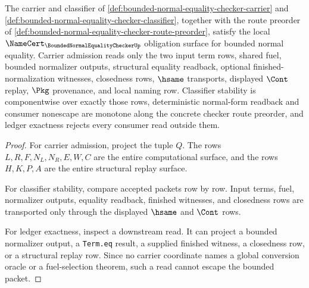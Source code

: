 \begin{theorem}
\label{thm:bounded-normal-equality-checker-namecert-obligations}
The carrier and classifier of
\autoref{def:bounded-normal-equality-checker-carrier} and
\autoref{def:bounded-normal-equality-checker-classifier}, together with the route preorder of \autoref{def:bounded-normal-equality-checker-route-preorder}, satisfy the local
$\NameCert_{\BoundedNormalEqualityCheckerUp}$ obligation surface for bounded
normal equality. Carrier admission reads only the two input term rows, shared
fuel, bounded normalizer outputs, structural equality readback, optional
finished-normalization witnesses, closedness rows, $\hsame$ transports,
displayed $\Cont$ replay, $\Pkg$ provenance, and local naming row. Classifier
stability is componentwise over exactly those rows, deterministic normal-form readback and consumer nonescape are monotone along the concrete checker route preorder, and ledger exactness
rejects every consumer read outside them.
\end{theorem}
\begin{proof}
For carrier admission, project the tuple $Q$. The rows $L,R,F,N_L,N_R,E,W,C$
are the entire computational surface, and the rows $H,K,P,A$ are the entire
structural replay surface.

For classifier stability, compare accepted packets row by row. Input terms,
fuel, normalizer outputs, equality readback, finished witnesses, and
closedness rows are transported only through the displayed $\hsame$ and
$\Cont$ rows.

For ledger exactness, inspect a downstream read. It can project a bounded
normalizer output, a \texttt{Term.eq} result, a supplied finished witness, a
closedness row, or a structural replay row. Since no carrier coordinate names a
global conversion oracle or a fuel-selection theorem, such a read cannot
escape the bounded packet.
\end{proof}

